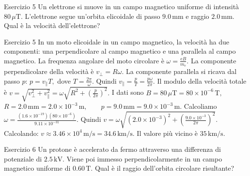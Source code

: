 \documentclass[a4paper]{article}
\begin{document}
\begin{snippetexercise}{Esercizio 5}
    Un elettrone si muove in un campo magnetico uniforme di intensità
    \(80\,\mu\mathrm{T}\). L'elettrone segue un'orbita elicoidale di passo
    \(9.0\,\mathrm{mm}\) e raggio \(2.0\,\mathrm{mm}\). Qual è la velocità
    dell'elettrone?

\end{snippetexercise}
\begin{snippetsolution}{Esercizio 5}
    In un moto elicoidale in un campo magnetico, la velocità ha due componenti:
    una perpendicolare al campo magnetico e una parallela al campo magnetico.
    La frequenza angolare del moto circolare è
    \(\omega = \frac{eB}{m_e}.\)
    La componente perpendicolare della velocità è
    \(v_{\perp} = R\omega.\)
    La componente parallela si ricava dal passo \(p\):
    \(p = v_{\parallel}T,\)
    dove
    \(T = \frac{2\pi}{\omega}.\)
    Quindi
    \(v_{\parallel} = \frac{p}{T} = \frac{p\omega}{2\pi}.\)
    Il modulo della velocità totale è
    \(v = \sqrt{v_{\perp}^2+v_{\parallel}^2} = \omega \sqrt{ R^2+\left(\frac{p}{2\pi}\right)^2 }.\)
    I dati sono
    \(B = 80\,\mu\mathrm{T} = 80 \times 10^{-6}\,\mathrm{T},\)
    \(R = 2.0\,\mathrm{mm} = 2.0 \times 10^{-3}\,\mathrm{m}, \qquad p = 9.0\,\mathrm{mm} = 9.0 \times 10^{-3}\,\mathrm{m}.\)
    Calcoliamo
    \(\omega = \frac{ \left(1.6 \times 10^{-19}\right) \left(80 \times 10^{-6}\right) }{ 9.11 \times 10^{-31} }.\)
    Quindi
    \(v = \omega \sqrt{ \left(2.0 \times 10^{-3}\right)^2 + \left( \frac{9.0 \times 10^{-3}}{2\pi} \right)^2 }.\)
    Calcolando:
    \(v \approx 3.46 \times 10^4\,\mathrm{m/s} = 34.6\,\mathrm{km/s}.\)
    Il valore più vicino è
    \(\boxed{35\,\mathrm{km/s}}.\)
\end{snippetsolution}
\begin{snippetexercise}{Esercizio 6}
    Un protone è accelerato da fermo attraverso una differenza di potenziale di
    \(2.5\,\mathrm{kV}\). Viene poi immesso perpendicolarmente in un campo
    magnetico uniforme di \(0.60\,\mathrm{T}\). Qual è il raggio dell'orbita
    circolare risultante?

\end{snippetexercise}
\end{document}
